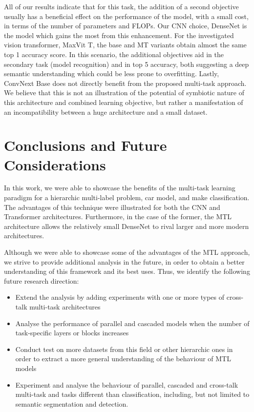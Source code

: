 \documentclass[conference]{IEEEtran}
\begin{document}
All of our results indicate that for this task, the addition of a second objective usually has a beneficial effect on the performance of the model, with a small cost, in terms of the number of parameters and FLOPs. Our CNN choice, DenseNet is the model which gains the most from this enhancement. For the investigated vision transformer, MaxVit T, the base and MT variants obtain almost the same top 1 accuracy score. In this scenario, the additional objectives aid in the secondary task (model recognition) and in top 5 accuracy, both suggesting a deep semantic understanding which could be less prone to overfitting. Lastly, ConvNext Base does not directly benefit from the proposed multi-task approach. We believe that this is not an illustration of the potential of symbiotic nature of this architecture and combined learning objective, but rather a manifestation of an incompatibility between a huge architecture and a small dataset. 


\section{Conclusions and Future Considerations}
\label{conclusion}

In this work, we were able to showcase the benefits of the multi-task learning paradigm for a hierarchic multi-label problem, car model, and make classification. The advantages of this technique were illustrated for both the CNN and Transformer architectures. Furthermore, in the case of the former, the MTL architecture allows the relatively small DenseNet to rival larger and more modern architectures. 

Although we were able to showcase some of the advantages of the MTL approach, we strive to provide additional analysis in the future, in order to obtain a better understanding of this framework and its best uses. Thus, we identify the following future research direction: 
\begin{itemize}
    \item Extend the analysis by adding experiments with one or more types of cross-talk multi-task architectures
    \item Analyse the performance of parallel and cascaded models when the number of task-specific layers or blocks increases
    \item Conduct test on more datasets from this field or other hierarchic ones in order to extract a more general understanding of the behaviour of MTL models
    \item Experiment and analyse the behaviour of parallel, cascaded and cross-talk multi-task and tasks different than classification, including, but not limited to semantic segmentation and detection.
\end{itemize}



\balance


\printbibliography

\vfill
\end{document}
